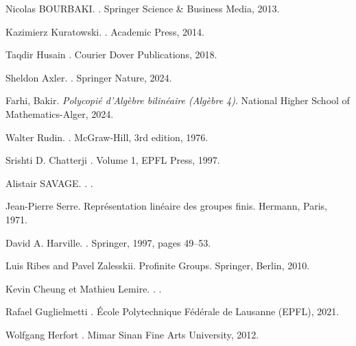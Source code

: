 \documentclass[a4paper, 14pt]{report}
\begin{document}
\begin{onehalfspace}
{\begin{thebibliography}{99}
	
		Nicolas BOURBAKI. 
	.
	\newblock Springer Science \& Business Media, 2013.
	
	
	Kazimierz Kuratowski.  
	.  
	\newblock Academic Press, 2014.
	
	
		Taqdir Husain  
	.  
	\newblock Courier Dover Publications, 2018.
	
	Sheldon Axler.
	.
	\newblock Springer Nature, 2024.
	
	Farhi, Bakir.
	\newblock \textit{Polycopié d'Algèbre bilinéaire (Algèbre 4)}.
	\newblock National Higher School of Mathematics-Alger, 2024.
	
		
	Walter Rudin.  
	.  
	\newblock McGraw-Hill, 3rd edition, 1976.
	
	
	Srishti D. Chatterji  
	.  
	\newblock Volume 1, EPFL Press, 1997.
	
		
	Alistair SAVAGE.
	.
	.
	
	
	
	Jean-Pierre Serre.
	\newblock Repr{\'e}sentation lin{\'e}aire des groupes finis.
	\newblock Hermann, Paris, 1971.
	
	David A. Harville.
	.
	\newblock Springer, 1997, pages 49--53.
	
	
	Luis Ribes and Pavel Zalesskii.
	\newblock Profinite Groups.
	\newblock Springer, Berlin, 2010.
	
	Kevin  Cheung et Mathieu Lemire.
	.
	.
	
		
	Rafael Guglielmetti  
	.  
	\newblock École Polytechnique Fédérale de Lausanne (EPFL), 2021. 
	
		
	Wolfgang Herfort  
	.  
	\newblock Mimar Sinan Fine Arts University, 2012. 
	

\end{thebibliography}}
\end{onehalfspace}
\end{document}
